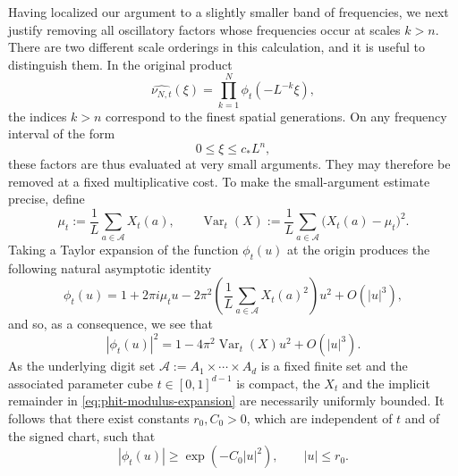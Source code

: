 \documentclass[12pt]{amsart}
\numberwithin{equation}{section}
\begin{document}
Having localized our argument to a slightly smaller band of frequencies, we next justify removing all oscillatory factors whose frequencies occur at scales $k > n$. There are two different scale orderings in this calculation, and it is useful to distinguish them. In the original product
\[
\widehat{\nu_{N,t}}(\xi)
=\prod_{k=1}^N\phi_t(-L^{-k}\xi),
\]
the indices $k>n$ correspond to the finest spatial generations. On any frequency interval of the form
\[
0\leq\xi\leq c_*L^n,
\]
these factors are thus evaluated at very small arguments. They may therefore be removed at a fixed multiplicative cost. To make the small-argument estimate precise, define
\begin{equation}\label{eq:projected-mean-variance}
\mu_t
:=\frac1L\sum_{a\in\mathcal A}X_t(a),
\qquad
\operatorname{Var}_t(X)
:=\frac1L\sum_{a\in\mathcal A}
\bigl(X_t(a)-\mu_t\bigr)^2.
\end{equation}
Taking a Taylor expansion of the function $\phi_t (u)$ at the origin produces the following natural asymptotic identity
\[
\phi_t(u)
=
1+2\pi i\mu_tu
-2\pi^2
 \left(\frac1L\sum_{a\in\mathcal A}X_t(a)^2\right)u^2
+O(|u|^3),
\]
and so, as a consequence, we see that
\begin{equation}\label{eq:phit-modulus-expansion}
|\phi_t(u)|^2
=
1-4\pi^2\operatorname{Var}_t(X)u^2
+O(|u|^3).
\end{equation}
As the underlying digit set $\mathcal{A} := A_1 \times \cdots \times A_d$ is a fixed finite set and the associated parameter cube $t \in [0,1]^{d-1}$ is compact, the $X_t$ and the implicit remainder in
\eqref{eq:phit-modulus-expansion} are necessarily uniformly bounded. It follows that there exist constants $r_0,C_0>0$, which are independent of $t$ and of the signed chart, such that
\begin{equation}\label{eq:digitsetnearzero}
|\phi_t(u)|\geq\exp(-C_0|u|^2),
\qquad |u|\leq r_0.
\end{equation}
\end{document}
